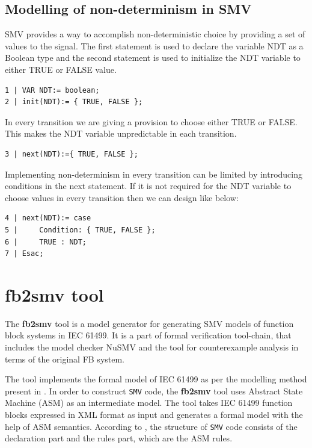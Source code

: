 \begin{bibunit}
\subsection{Modelling of non-determinism in SMV}\label{sec:NDTinSMV}

SMV provides a way to accomplish non-deterministic choice by providing a set of values to the signal. The first statement is used to declare the variable NDT as a Boolean type and the second statement is used to initialize the NDT variable to either TRUE or FALSE value.

\begin{lstlisting}[breaklines,basicstyle=\small]
1 | VAR NDT:= boolean;
2 | init(NDT):= { TRUE, FALSE };
\end{lstlisting}

In every transition we are giving a provision to choose either TRUE or FALSE. This makes the NDT variable unpredictable in each transition.

\begin{lstlisting}[breaklines,basicstyle=\small]
3 | next(NDT):={ TRUE, FALSE };
\end{lstlisting}

Implementing non-determinism in every transition can be limited by introducing conditions in the next statement. If it is not required for the NDT variable to choose values in every transition then we can design like below:

\begin{lstlisting}[breaklines,basicstyle=\small]
4 | next(NDT):= case
5 | 	Condition: { TRUE, FALSE };
6 |     TRUE : NDT;
7 | Esac;
\end{lstlisting}

\section{fb2smv tool}\label{sec:fb2smv_tool}

The \textbf{fb2smv} tool \cite{fb2smv} is a model generator for generating SMV models of function block systems in IEC 61499. It is a part of formal verification tool-chain, that includes the model checker NuSMV and the tool for counterexample analysis in terms of the original FB system. 

The tool implements the formal model of IEC 61499 as per the modelling method present in \cite{drozdov2021formal}. In order to construct \texttt{SMV} code, the \textbf{fb2smv} tool uses Abstract State Machine (ASM) \cite{gurevich1995evolving} as an intermediate model. The tool takes IEC 61499 function blocks expressed in XML format as input and generates a formal model with the help of ASM semantics. According to \cite{drozdov2021formal}, the structure of \texttt{SMV} code consists of the declaration part and the rules part, which are the ASM rules.


\end{bibunit}
